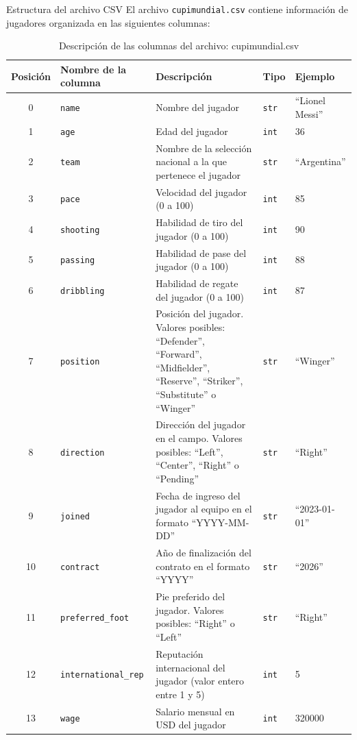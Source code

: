 \documentclass{ip-lab}
\begin{document}
\begin{sectionbox}{Estructura del archivo CSV}
  El archivo \texttt{cupimundial.csv} contiene información de jugadores organizada en las siguientes columnas:

  \begin{table}[H]
  \centering
  \caption{Descripción de las columnas del archivo: cupimundial.csv}
  \begin{tabular}{|c|l|p{4cm}|l|l|}
  \hline
  \textbf{Posición} & \textbf{Nombre de la columna} & \textbf{Descripción} & \textbf{Tipo} & \textbf{Ejemplo} \\
  \hline
  0 & \texttt{name} & Nombre del jugador & \texttt{str} & ``Lionel Messi'' \\
  \hline
  1 & \texttt{age} & Edad del jugador & \texttt{int} & 36 \\
  \hline
  2 & \texttt{team} & Nombre de la selección nacional a la que pertenece el jugador & \texttt{str} & ``Argentina'' \\
  \hline
  3 & \texttt{pace} & Velocidad del jugador (0 a 100) & \texttt{int} & 85 \\
  \hline
  4 & \texttt{shooting} & Habilidad de tiro del jugador (0 a 100) & \texttt{int} & 90 \\
  \hline
  5 & \texttt{passing} & Habilidad de pase del jugador (0 a 100) & \texttt{int} & 88 \\
  \hline
  6 & \texttt{dribbling} & Habilidad de regate del jugador (0 a 100) & \texttt{int} & 87 \\
  \hline
  7 & \texttt{position} & Posición del jugador. Valores posibles: ``Defender'', ``Forward'', ``Midfielder'', ``Reserve'', ``Striker'', ``Substitute'' o ``Winger'' & \texttt{str} & ``Winger'' \\
  \hline
  8 & \texttt{direction} & Dirección del jugador en el campo. Valores posibles: ``Left'', ``Center'', ``Right'' o ``Pending'' & \texttt{str} & ``Right'' \\
  \hline
  9 & \texttt{joined} & Fecha de ingreso del jugador al equipo en el formato ``YYYY-MM-DD'' & \texttt{str} & ``2023-01-01'' \\
  \hline
  10 & \texttt{contract} & Año de finalización del contrato en el formato ``YYYY'' & \texttt{str} & ``2026'' \\
  \hline
  11 & \texttt{preferred\_foot} & Pie preferido del jugador. Valores posibles: ``Right'' o ``Left'' & \texttt{str} & ``Right'' \\
  \hline
  12 & \texttt{international\_rep} & Reputación internacional del jugador (valor entero entre 1 y 5) & \texttt{int} & 5 \\
  \hline
  13 & \texttt{wage} & Salario mensual en USD del jugador & \texttt{int} & 320000 \\
  \hline
  \end{tabular}
  \end{table}
\end{sectionbox}
\end{document}
